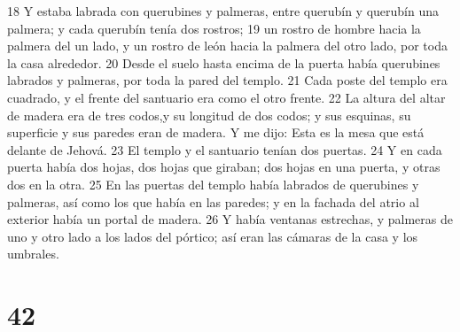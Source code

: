 18 Y estaba labrada con querubines y palmeras, entre querubín y querubín una palmera; y cada querubín tenía dos rostros;
19 un rostro de hombre hacia la palmera del un lado, y un rostro de león hacia la palmera del otro lado, por toda la casa alrededor.
20 Desde el suelo hasta encima de la puerta había querubines labrados y palmeras, por toda la pared del templo.
21 Cada poste del templo era cuadrado, y el frente del santuario era como el otro frente.
22 La altura del altar de madera era de tres codos,y su longitud de dos codos; y sus esquinas, su superficie y sus paredes eran de madera. Y me dijo: Esta es la mesa que está delante de Jehová.
23 El templo y el santuario tenían dos puertas.
24 Y en cada puerta había dos hojas, dos hojas que giraban; dos hojas en una puerta, y otras dos en la otra.
25 En las puertas del templo había labrados de querubines y palmeras, así como los que había en las paredes; y en la fachada del atrio al exterior había un portal de madera.
26 Y había ventanas estrechas, y palmeras de uno y otro lado a los lados del pórtico; así eran las cámaras de la casa y los umbrales.

\chapter{42}

